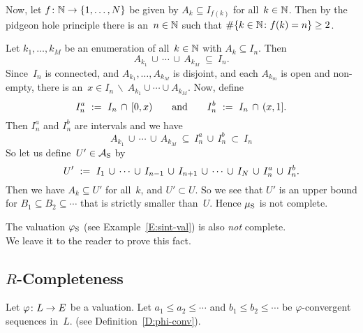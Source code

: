 \documentclass[main.tex]{subfiles}
\begin{document}
\begin{ex}
Now, let $f\colon \mathbb{N} \rightarrow \{ 1, \dotsc, N \}$
be given by $A_k \subseteq I_{f(k)}$ for all~$k\in \mathbb{N}$.
Then by the pidgeon hole principle
there is an~$n\in\mathbb{N}$ such that $\#\{k\in\mathbb{N}\colon f(k)=n\} \geq 2$.

Let $k_1,\dotsc,k_M$
be an enumeration of all~$k\in\mathbb{N}$ with $A_k\subseteq I_n$.
Then 
\begin{equation*}
A_{k_1} \,\cup\, \dotsb \,\cup\, A_{k_M} \ \subseteq \ I_n.
\end{equation*}
Since~$I_n$ is connected, and  $A_{k_1},\dotsc,A_{k_M}$
is disjoint,
and each $A_{k_m}$ is open and non-empty,
there is an~$x\in I_n \,\backslash\  A_{k_1}\cup\dotsb\cup A_{k_M}$.
Now, define
\begin{equation*}
I^a_n \ :=\  I_n \,\cap\, [0,x)
\qquad\text{and}\qquad
I^b_n \ :=\  I_n \,\cap\, (x,1].
\end{equation*}
Then $I^a_n$ and $I^b_n$ are intervals
and we have
\begin{equation*}
A_{k_1} \,\cup\,\dotsb\,\cup\, A_{k_M}
\ \subseteq\ 
I^a_n \,\cup\, I^b_n
\ \subset \ I_n
\end{equation*}
So let us define~$U'\in\mathcal{A}_{\mathrm{S}}$ by 
\begin{equation*}
U'\ \eqdf\ 
I_1 \,\cup\,\dotsb \,\cup\, I_{n-1} \,\cup\,
I_{n+1} \,\cup\, \dotsb \,\cup\, I_N\,\cup\,I^a_n\,\cup\,I^b_n.
\end{equation*}
Then we have $A_k \subseteq U'$ for all~$k$,
and $U'\subset U$.
So we see that $U'$ is an upper bound for $B_1\subseteq B_2 \subseteq\dotsb$
that is strictly smaller than~$U$.
Hence $\mu_{\mathrm{S}}$ is not complete.
\end{ex}
%
%
\begin{ex}
The valuation $\varphi_{\mathrm{S}}$ 
(see Example~\ref{E:sint-val}) is also \emph{not} complete.\\
We leave it to the reader to prove this fact.
\end{ex}

%
\subsection{$R$-Completeness}
\label{SS:complete-val_R-completeness}
Let $\varphi\colon L \rightarrow E$ be a valuation.
Let $a_1 \leq a_2 \leq \dotsb$
and $b_1 \leq b_2 \leq \dotsb$ be $\varphi$-convergent sequences in~$L$.
(see Definition~\ref{D:phi-conv}).
\end{document}
